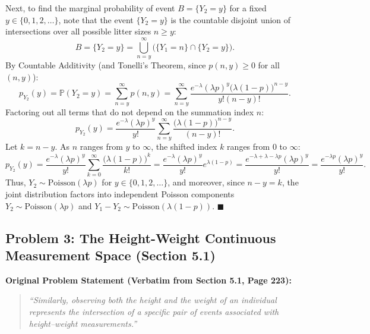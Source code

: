 \documentclass[11pt, letterpaper]{article}
\theoremstyle{definition}
\theoremstyle{remark}
\newcommand{\Prob}{\mathbb{P}}
\begin{document}
Next, to find the marginal probability of event $B = \{Y_2 = y\}$ for a fixed $y \in \{0, 1, 2, \dots\}$, note that the event $\{Y_2 = y\}$ is the countable disjoint union of intersections over all possible litter sizes $n \ge y$:
\[
B = \{Y_2 = y\} = \bigcup_{n=y}^{\infty} \bigl(\{Y_1 = n\} \cap \{Y_2 = y\}\bigr).
\]
By Countable Additivity (and Tonelli's Theorem, since $p(n, y) \ge 0$ for all $(n, y)$):
\[
p_{Y_2}(y) = \Prob(Y_2 = y) = \sum_{n=y}^{\infty} p(n, y) = \sum_{n=y}^{\infty} \frac{e^{-\lambda} (\lambda p)^y \bigl(\lambda(1-p)\bigr)^{n-y}}{y!(n-y)!}.
\]
Factoring out all terms that do not depend on the summation index $n$:
\[
p_{Y_2}(y) = \frac{e^{-\lambda}(\lambda p)^y}{y!} \sum_{n=y}^{\infty} \frac{\bigl(\lambda(1-p)\bigr)^{n-y}}{(n-y)!}.
\]
Let $k = n - y$. As $n$ ranges from $y$ to $\infty$, the shifted index $k$ ranges from $0$ to $\infty$:
\[
p_{Y_2}(y) = \frac{e^{-\lambda}(\lambda p)^y}{y!} \sum_{k=0}^{\infty} \frac{\bigl(\lambda(1-p)\bigr)^{k}}{k!} = \frac{e^{-\lambda}(\lambda p)^y}{y!} e^{\lambda(1-p)} = \frac{e^{-\lambda + \lambda - \lambda p}(\lambda p)^y}{y!} = \frac{e^{-\lambda p}(\lambda p)^y}{y!}.
\]
Thus, $Y_2 \sim \text{Poisson}(\lambda p)$ for $y \in \{0, 1, 2, \dots\}$, and moreover, since $n - y = k$, the joint distribution factors into independent Poisson components $Y_2 \sim \text{Poisson}(\lambda p)$ and $Y_1 - Y_2 \sim \text{Poisson}(\lambda(1-p))$. $\blacksquare$

\subsection{Problem 3: The Height-Weight Continuous Measurement Space (Section 5.1)}

\textbf{Original Problem Statement (Verbatim from Section 5.1, Page 223):}
\begin{quote}
\emph{``Similarly, observing both the height and the weight of an individual represents the intersection of a specific pair of events associated with height--weight measurements.''}
\end{quote}
\end{document}
